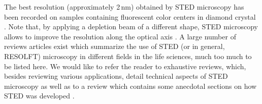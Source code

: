 The best resolution (approximately 2\,nm) obtained by STED microscopy has
been recorded on samples containing fluorescent color centers in diamond
crystal \cite{Wildanger2012}. Note that, by applying a depletion beam of a
different shape, STED microscopy allows to improve the resolution along the
optical axis \cite{Harke2008, Wildanger2009}. A large number of reviews articles exist
which summarize the use of STED (or in general, RESOLFT) microscopy in different
fields in the life sciences, much too much to be listed here. We would like to
refer the reader to exhaustive reviews, which, besides
reviewing various applications, detail technical aspects of STED microscopy
\cite{Turkowyd2016,Blom2017} as well as to a review which contains some
anecdotal sections on how STED was developed \cite{Sahl2019}.













